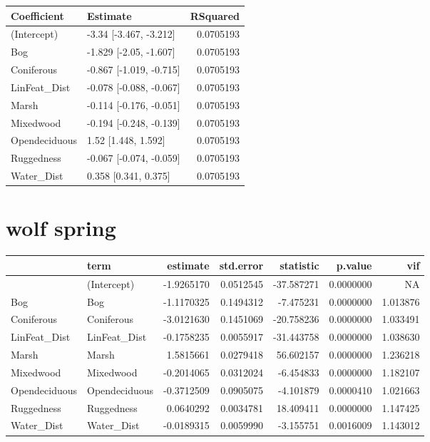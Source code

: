 \documentclass[]{article}
\begin{document}
\begin{tabular}{llr}
\toprule
Coefficient & Estimate & RSquared\\
\midrule
(Intercept) & -3.34 [-3.467, -3.212] & 0.0705193\\
Bog & -1.829 [-2.05, -1.607] & 0.0705193\\
Coniferous & -0.867 [-1.019, -0.715] & 0.0705193\\
LinFeat\_Dist & -0.078 [-0.088, -0.067] & 0.0705193\\
Marsh & -0.114 [-0.176, -0.051] & 0.0705193\\
Mixedwood & -0.194 [-0.248, -0.139] & 0.0705193\\
Opendeciduous & 1.52 [1.448, 1.592] & 0.0705193\\
Ruggedness & -0.067 [-0.074, -0.059] & 0.0705193\\
Water\_Dist & 0.358 [0.341, 0.375] & 0.0705193\\
\bottomrule
\end{tabular}

\section{wolf spring}\label{wolf-spring}

\begin{tabular}{llrrrrr}
\toprule
  & term & estimate & std.error & statistic & p.value & vif\\
\midrule
 & (Intercept) & -1.9265170 & 0.0512545 & -37.587271 & 0.0000000 & NA\\
Bog & Bog & -1.1170325 & 0.1494312 & -7.475231 & 0.0000000 & 1.013876\\
Coniferous & Coniferous & -3.0121630 & 0.1451069 & -20.758236 & 0.0000000 & 1.033491\\
LinFeat\_Dist & LinFeat\_Dist & -0.1758235 & 0.0055917 & -31.443758 & 0.0000000 & 1.038630\\
Marsh & Marsh & 1.5815661 & 0.0279418 & 56.602157 & 0.0000000 & 1.236218\\
Mixedwood & Mixedwood & -0.2014065 & 0.0312024 & -6.454833 & 0.0000000 & 1.182107\\
Opendeciduous & Opendeciduous & -0.3712509 & 0.0905075 & -4.101879 & 0.0000410 & 1.021663\\
Ruggedness & Ruggedness & 0.0640292 & 0.0034781 & 18.409411 & 0.0000000 & 1.147425\\
Water\_Dist & Water\_Dist & -0.0189315 & 0.0059990 & -3.155751 & 0.0016009 & 1.143012\\
\bottomrule
\end{tabular}
\end{document}
